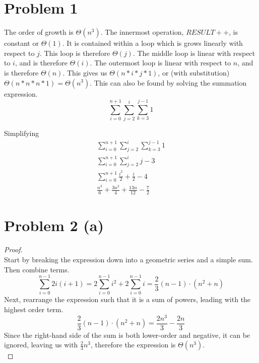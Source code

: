 \documentclass{article}
\newenvironment{problem}[1]{
  \nobreak\section*{Problem #1}
}{}
\newcommand*{\bigTheta}[1]{\ensuremath{\Theta\left(#1\right)}}
\begin{document}
  \begin{problem}{1}
    The order of growth is $\bigTheta{n^3}$.  The innermost operation,
    $RESULT++$, is constant or $\bigTheta{1}$.  It is contained within
    a loop which is grows linearly with respect to $j$.  This loop is
    therefore $\bigTheta{j}$.  The middle loop is linear with respect
    to $i$, and is therefore $\bigTheta{i}$.  The outermost loop is
    linear with respect to $n$, and is therefore $\bigTheta{n}$.
    This gives us $\bigTheta{n * i * j * 1}$, or (with substitution)
    $\bigTheta{n * n * n * 1} = \bigTheta{n^3}$.  This can also be
    found by solving the summation expression.
    \begin{displaymath}
      \sum_{i = 0}^{n + 1} \sum_{j = 2}^{i} \sum_{k = 3}^{j - 1} 1
    \end{displaymath}

    Simplifying
    \begin{displaymath}
      \begin{split}
        \sum_{i = 0}^{n + 1} \sum_{j = 2}^{i} \sum_{k = 3}^{j - 1} 1 \\
        \sum_{i = 0}^{n + 1} \sum_{j = 2}^{i} j - 3 \\
        \sum_{i = 0}^{n + 1} \frac{i^2}{2} + \frac{i}{2} - 4 \\
        \frac{n^3}{6} + \frac{3n^2}{4} + \frac{13n}{12} - \frac{7}{2}
      \end{split}
    \end{displaymath}
  \end{problem}

  \begin{problem}{2 (a)}
    \begin{proof}
      $ $\\
      Start by breaking the expression down into a geometric series and
      a simple sum.  Then combine terms.
      \begin{displaymath}
        \sum_{i = 0}^{n - 1} 2i(i + 1) = 2\sum_{i = 0}^{n - 1} i^2 + 2\sum_{i = 0}^{n - 1} i = \frac{2}{3}(n - 1) \cdot (n^2 + n)
      \end{displaymath}
      Next, rearrange the expression such that it is a sum of powers,
      leading with the highest order term.
      \begin{displaymath}
        \frac{2}{3}(n - 1) \cdot (n^2 + n) = \frac{2n^3}{3} - \frac{2n}{3}
      \end{displaymath}
      Since the right-hand side of the sum is both lower-order and negative, it
      can be ignored, leaving us with $\frac{2}{3}n^3$, therefore the expression
      is $\bigTheta{n^3}$.
      $ $\\
    \end{proof}
  \end{problem}
\end{document}
